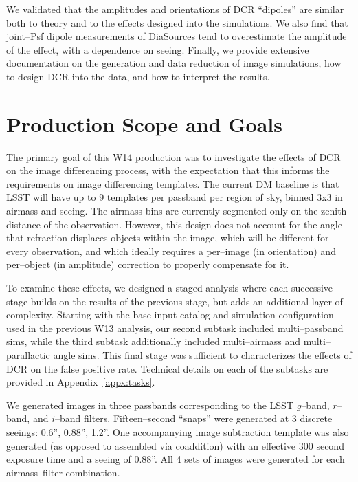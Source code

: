 \documentclass[prd, nofootinbib, floatfix, 11pt, tightenlines, times]{article}
\begin{document}
We validated that the amplitudes and orientations of DCR ``dipoles''
are similar both to theory and to the effects designed into the
simulations.  We also find that joint--Psf dipole measurements of
DiaSources tend to overestimate the amplitude of the effect, with a
dependence on seeing.  Finally, we provide extensive documentation on
the generation and data reduction of image simulations, how to design
DCR into the data, and how to interpret the results.

\clearpage
\tableofcontents
\clearpage

\section{Production Scope and Goals}

The primary goal of this W14 production was to investigate the effects
of DCR on the image differencing process, with the expectation that
this informs the requirements on image differencing templates.  The
current DM baseline is that LSST will have up to 9 templates per
passband per region of sky, binned 3x3 in airmass and seeing.  The
airmass bins are currently segmented only on the zenith distance of
the observation.  However, this design does not account for the angle
that refraction displaces objects within the image, which will be
different for every observation, and which ideally requires a
per--image (in orientation) and per--object (in amplitude) correction
to properly compensate for it.

To examine these effects, we designed a staged analysis where each
successive stage builds on the results of the previous stage, but adds
an additional layer of complexity.  Starting with the base input
catalog and simulation configuration used in the previous W13
analysis, our second subtask included multi--passband sims, while the
third subtask additionally included multi--airmass and
multi--parallactic angle sims.  This final stage was sufficient to
characterizes the effects of DCR on the false positive rate.
Technical details on each of the subtasks are provided in
Appendix~\ref{appx:tasks}.

We generated images in three passbands corresponding to the LSST
$g$--band, $r$--band, and $i$--band filters.  Fifteen--second
``snaps'' were generated at 3 discrete seeings: 0.6'', 0.88'', 1.2''.
One accompanying image subtraction template was also generated (as
opposed to assembled via coaddition) with an effective 300 second
exposure time and a seeing of 0.88''.  All 4 sets of images were
generated for each airmass--filter combination.
\end{document}
